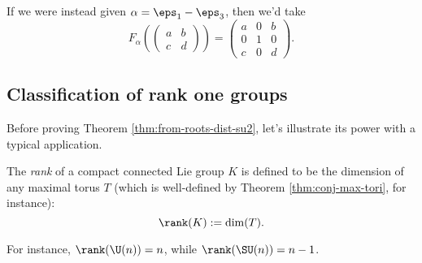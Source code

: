 \documentclass[reqno]{amsart} 
\begin{document}
If we were instead given $\alpha = \eps_{1} - \eps_3$, then we'd take
\begin{equation*}
  F_\alpha (
\begin{pmatrix}
    a & b \\
    c & d
  \end{pmatrix}
) = 
\begin{pmatrix}
    a & 0 & b \\
    0 & 1 & 0 \\
    c & 0 & d
  \end{pmatrix}
.
\end{equation*}

\subsection{Classification of rank one groups}
Before proving Theorem \ref{thm:from-roots-dist-su2}, let's illustrate its power with a typical application.
\begin{definition}
  The \emph{rank} of a compact connected Lie group $K$ is defined to be the dimension of any maximal torus $T$ (which is well-defined by Theorem \ref{thm:conj-max-tori}, for instance):
  \begin{equation*}
    \rank(K) := \dim(T).
  \end{equation*}
\end{definition}
For instance, $\rank(\U(n)) = n$, while $\rank(\SU(n)) = n-1$.
\end{document}
